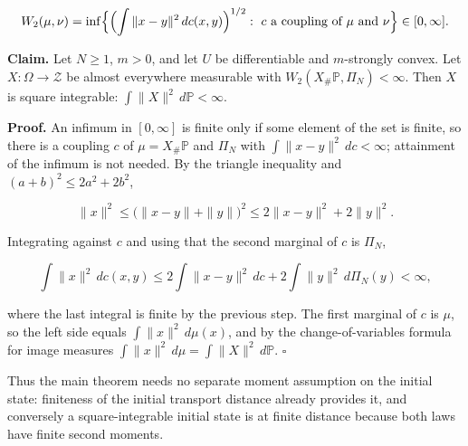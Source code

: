 \documentclass[11pt,a4paper]{report}
\begin{document}
\[W_2(\mu,\nu)=\inf\Bigl\{\Bigl(\int\|x-y\|^2\,dc(x,y)\Bigr)^{1/2}:\ c\text{ a coupling of }\mu\text{ and }\nu\Bigr\}\in[0,\infty].\]


\textbf{Claim.} Let \(N\ge1\), \(m>0\), and let \(U\) be differentiable and \(m\)-strongly convex. Let \(X:\Omega\to\mathcal Z\) be almost everywhere measurable with \(W_2(X_\#\mathbb P,\Pi_N)<\infty\). Then \(X\) is square integrable: \(\int\|X\|^2\,d\mathbb P<\infty\).




\textbf{Proof.} An infimum in \([0,\infty]\) is finite only if some element of the set is finite, so there is a coupling \(c\) of \(\mu=X_\#\mathbb P\) and \(\Pi_N\) with \(\int\|x-y\|^2\,dc<\infty\); attainment of the infimum is not needed. By the triangle inequality and \((a+b)^2\le2a^2+2b^2\),


\[\|x\|^2\le\bigl(\|x-y\|+\|y\|\bigr)^2\le2\|x-y\|^2+2\|y\|^2 .\]


Integrating against \(c\) and using that the second marginal of \(c\) is \(\Pi_N\),


\[\int\|x\|^2\,dc(x,y)\le2\int\|x-y\|^2\,dc+2\int\|y\|^2\,d\Pi_N(y)<\infty,\]


where the last integral is finite by the previous step. The first marginal of \(c\) is \(\mu\), so the left side equals \(\int\|x\|^2\,d\mu(x)\), and by the change-of-variables formula for image measures \(\int\|x\|^2\,d\mu=\int\|X\|^2\,d\mathbb P\). \(\square\)




Thus the main theorem needs no separate moment assumption on the initial state: finiteness of the initial transport distance already provides it, and conversely a square-integrable initial state is at finite distance because both laws have finite second moments.
\end{document}
